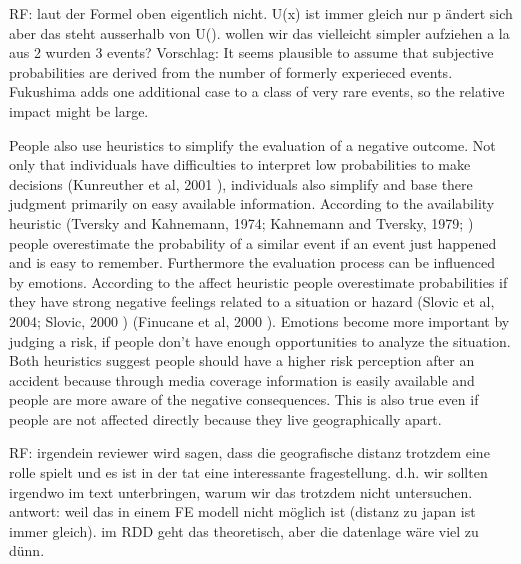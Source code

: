 RF: laut der Formel oben eigentlich nicht. U(x) ist immer gleich nur p ändert sich aber das steht ausserhalb von U(). wollen wir das vielleicht simpler aufziehen a la aus 2 wurden 3 events? Vorschlag:
It seems plausible to assume that subjective probabilities are derived from the number of formerly experieced events. Fukushima adds one additional case to a class of very rare events, so the relative impact might be large.

People also use heuristics to simplify the evaluation of a negative outcome. Not only that individuals have difficulties to interpret low probabilities to make decisions (Kunreuther et al, 2001 \citep{Kunreuther:2001dj}),   individuals also simplify and base there judgment primarily on easy available information. According to the availability heuristic  (Tversky and Kahnemann, 1974; Kahnemann and Tversky, 1979; \citep{Tversky:1974wi,Tversky:1973ui, kahnemann_prospect_1979}) people overestimate the probability of a similar event if an event just happened and is easy to remember. Furthermore the evaluation process can be influenced by emotions. According to the affect heuristic people overestimate probabilities if they have strong negative feelings related to a situation or hazard (Slovic et al, 2004; Slovic, 2000 \citep{Slovic:2004hj}\citep{Slovic:2000tx}) (Finucane et al, 2000 \citep{Finucane:2000wu}). Emotions become more important by judging a risk, if people don't have enough opportunities to analyze the situation. Both heuristics suggest people should have a higher risk perception after an accident because through media coverage information is easily available and people are more aware of the negative consequences. This is also true even if people are not affected directly because they live geographically apart.          

RF: irgendein reviewer wird sagen, dass die geografische distanz trotzdem eine rolle spielt und es ist in der tat eine interessante fragestellung. d.h. wir sollten irgendwo im text unterbringen, warum wir das trotzdem nicht untersuchen. antwort: weil das in einem FE modell nicht möglich ist (distanz zu japan ist immer gleich). im RDD geht das theoretisch, aber die datenlage wäre viel zu dünn.

